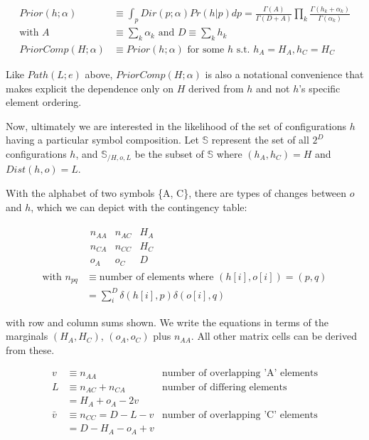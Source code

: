 \documentclass{article}
\begin{document}
\begin{align}
Prior(h;\alpha) & \equiv \int_p{Dir(p;\alpha) Pr(h|p)dp}
= \frac{\Gamma(A)}{\Gamma(D+A)}
\prod_k \frac{\Gamma(h_k+\alpha_k)}{\Gamma(\alpha_k)} \\[2ex]
\text{with } A & \equiv \sum_k \alpha_k \text{ and } D \equiv \sum_k h_k \nonumber \\[2ex]
PriorComp(H;\alpha) & \equiv Prior(h;\alpha) \text{ for some } h \text{ s.t. } h_A = H_A, h_C = H_C
\end{align}

Like $Path(L;e)$ above, $PriorComp(H;\alpha)$ is also a notational
convenience that makes explicit the dependence only on $H$ derived
from $h$ and not $h$'s specific element ordering.

Now, ultimately we are interested in the likelihood of the set of
configurations $h$ having a particular symbol composition. Let
$\mathbb{S}$ represent the set of all $2^D$ configurations $h$, and
$\mathbb{S}_{/H,o,L}$ be the subset of $\mathbb{S}$ where $(h_A,h_C) =
H$ and $Dist(h, o) = L$.

With the alphabet of two symbols \{A, C\}, there are types of changes
between $o$ and $h$, which we can depict with the contingency table:

\begin{align*}
  & \begin{matrix}
    n_{AA} & n_{AC} & H_A \\
    n_{CA} & n_{CC} & H_C \\
    o_A & o_C & D
  \end{matrix} \\[2ex]
  \text{with }
  n_{pq} & \equiv \text{number of elements where } (h[i],o[i]) = (p,q) \\
  & = \sum_{i}^{D} \delta(h[i],p) \delta(o[i],q)
\end{align*}

with row and column sums shown.  We write the equations in terms of
the marginals $(H_A, H_C)$, $(o_A, o_C)$ plus $n_{AA}$. All other
matrix cells can be derived from these.

\begin{align*}
  v & \equiv n_{AA} & \text{number of overlapping 'A' elements} \\
  L & \equiv n_{AC} + n_{CA} & \text{number of differing elements} \nonumber \\
  & = H_A + o_A - 2v \\
  \bar{v} & \equiv n_{CC} = D - L - v & \text{number of overlapping 'C' elements} \\
  & = D - H_A - o_A + v
\end{align*}
\end{document}
